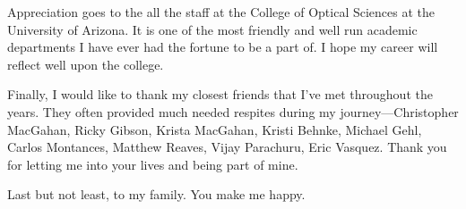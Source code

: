 Appreciation goes to the all the staff at the College of Optical Sciences at the University of Arizona. It is one of the most friendly and well run academic departments I have ever had the fortune to be a part of. I hope my career will reflect well upon the college. 

Finally, I would like to thank my closest friends that I've met throughout the years. They often provided much needed respites during my journey---Christopher MacGahan, Ricky Gibson, Krista MacGahan, Kristi Behnke, Michael Gehl, Carlos Montances, Matthew Reaves, Vijay Parachuru, Eric Vasquez. Thank you for letting me into your lives and being part of mine.

Last but not least, to my family. You make me happy. 